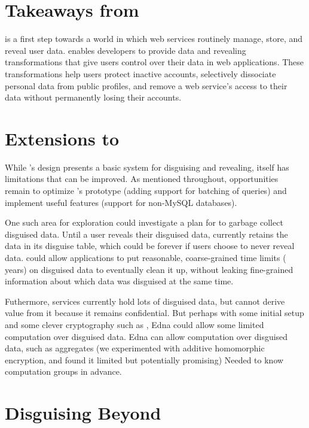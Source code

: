 \section{Takeaways from \sys}
%
\sys is a first step towards a world in which web services routinely manage,
store, and reveal \xxed user data.
%
\sys enables developers to provide data \xxing and revealing transformations
that give users control over their data in web applications.
%
These transformations help users protect inactive accounts, selectively
dissociate personal data from public profiles, and remove a web service's access
to their data without permanently losing their accounts.
%

\section{Extensions to \sys}
While \sys's design presents a basic system for disguising and revealing, \sys
itself has limitations that can be improved. 
%
As mentioned throughout, opportunities remain to optimize \sys's prototype
(\eg adding support for batching of queries) and implement useful features 
(\eg support for non-MySQL databases). 
%

%
One such area for exploration could investigate a plan for \sys to garbage
collect disguised data.  Until a user reveals their disguised data, \sys
currently retains the data in its disguise table, which could be forever if
users choose to never reveal data.
%
\sys could allow applications to put reasonable, coarse-grained time limits ( years) on disguised data to eventually clean it up, without leaking
fine-grained information about which data was disguised at the same time.

%
Futhermore, services currently hold lots of disguised data, but cannot derive
value from it because it remains confidential. But perhaps with some initial
setup and some clever cryptography such as ,
Edna could allow some limited computation over disguised data.
%
Edna can allow computation over disguised data, such as aggregates (we
experimented with additive homomorphic encryption, and found it limited but
potentially promising) Needed to know computation groups in advance.

\section{Disguising Beyond \sys}

